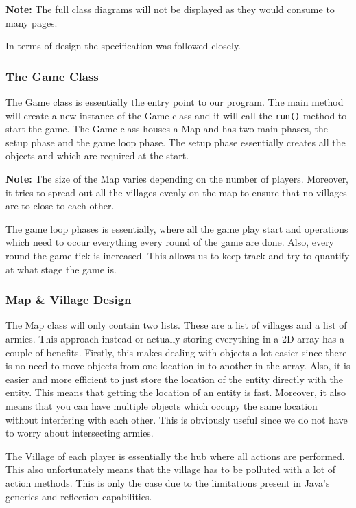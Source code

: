 \documentclass[12pt]{article}
\begin{document}
\textbf{Note:} The full class diagrams will not be displayed as
they would consume to many pages.

In terms of design the specification was followed closely.

\subsubsection{The Game Class}

The Game class is essentially the entry point to our program.
The main method will create a new instance of the Game class and
it will call the \texttt{run()} method to start the game. The
Game class houses a Map and has two main phases, the setup
phase and the game loop phase. The setup phase essentially
creates all the objects and which are required at the start.

\textbf{Note:} The size of the Map varies depending on the
number of players. Moreover, it tries to spread out all the
villages evenly on the map to ensure that no villages are to
close to each other.

The game loop phases is essentially, where all the game play
start and operations which need to occur everything every round
of the game are done. Also, every round the game tick is
increased. This allows us to keep track and try to quantify at
what stage the game is.

\subsubsection{Map \& Village Design}

The Map class will only contain two lists. These are a list of
villages and a list of armies. This approach instead or actually
storing everything in a 2D array has a couple of benefits.
Firstly, this makes dealing with objects a lot easier since
there is no need to move objects from one location in
to another in the array. Also, it is easier and more efficient to
just store the location of the entity directly with the entity.
This means that getting the location of an entity is fast.
Moreover, it also means that you can have multiple objects which
occupy the same location without interfering with each other.
This is obviously useful since we do not have to worry about
intersecting armies.

The Village of each player is essentially the hub where all
actions are performed. This also unfortunately means that the
village has to be polluted with a lot of action methods. This is
only the case due to the limitations present in Java's generics
and reflection capabilities.
\end{document}
